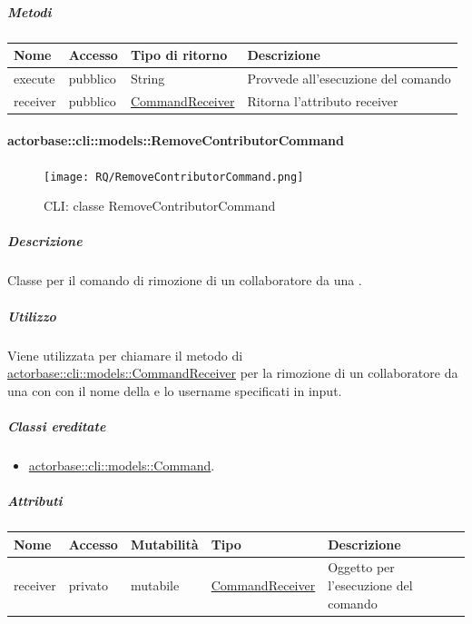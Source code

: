 \documentclass{scalatekids-article}
\begin{document}
\subparagraph{Metodi}

\begin{tabular}{| l | l | l | l |}
  \hline
  Nome & Accesso & Tipo di ritorno & Descrizione\\
  \hline
  execute & pubblico & String & Provvede all'esecuzione del comando\\
  \hline
  receiver & pubblico & \hyperref[sec:actorbase::cli::models::CommandReceiver]{CommandReceiver} & Ritorna l'attributo receiver\\
  \hline
\end{tabular}

\paragraph{actorbase::cli::models::RemoveContributorCommand}
\label{sec:actorbase::cli::models::RemoveContributorCommand}

\begin{figure}[H]
  \begin{center}
    \texttt{[image: RQ/RemoveContributorCommand.png]}
    \caption{CLI: classe RemoveContributorCommand}
  \end{center}
\end{figure}

\subparagraph{Descrizione}

Classe per il comando di rimozione di un collaboratore da una .

\subparagraph{Utilizzo}

Viene utilizzata per chiamare il metodo di
\hyperref[sec:actorbase::cli::models::CommandReceiver]{actorbase::cli::models::CommandReceiver} per la rimozione di un collaboratore
da una  con con il nome della  e lo username
specificati in input.

\subparagraph{Classi ereditate}

\begin{itemize}
\item \hyperref[sec:actorbase::cli::models::Command]{actorbase::cli::models::Command}.
\end{itemize}

\subparagraph{Attributi}

\begin{tabular}{| p{1cm} | p{1.5cm} | p{2cm} | p{4cm} | p{8.5cm} |}
  \hline
  Nome & Accesso & Mutabilità & Tipo & Descrizione\\
  \hline
  receiver & privato & mutabile & \hyperref[sec:actorbase::cli::models::CommandReceiver]{CommandReceiver} & Oggetto per l'esecuzione del comando\\
  \hline
\end{tabular}
\end{document}
